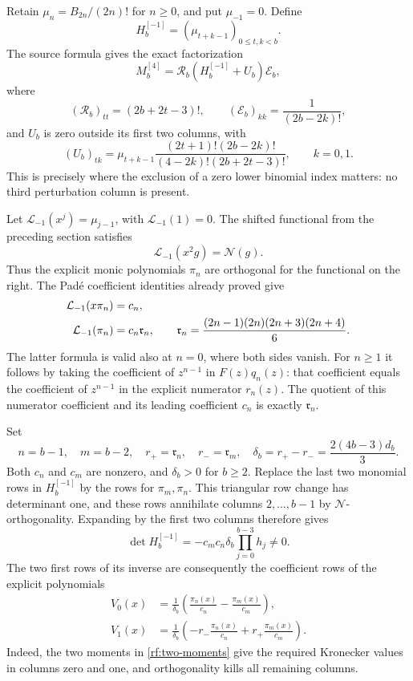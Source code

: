 Retain $\mu_n=B_{2n}/(2n)!$ for $n\geq0$, and put $\mu_{-1}=0$.
Define
\[
 H_b^{[-1]}=(\mu_{t+k-1})_{0\leq t,k<b}.
\]
The source formula gives the exact factorization
\begin{equation}\label{rf:factorization}
 M_b^{[4]}=\mathcal R_b(H_b^{[-1]}+U_b)\mathcal E_b,
\end{equation}
where
\[
 (\mathcal R_b)_{tt}=(2b+2t-3)!,\qquad
 (\mathcal E_b)_{kk}=\frac1{(2b-2k)!},
\]
and $U_b$ is zero outside its first two columns, with
\begin{equation}\label{rf:U}
 (U_b)_{tk}=\mu_{t+k-1}
  \frac{(2t+1)!(2b-2k)!}
       {(4-2k)!(2b+2t-3)!},\qquad k=0,1.
\end{equation}
This is precisely where the exclusion of a zero lower binomial
index matters: no third perturbation column is present.

Let $\mathcal L_{-1}(x^j)=\mu_{j-1}$, with
$\mathcal L_{-1}(1)=0$.  The shifted functional from the preceding
section satisfies
\[
 \mathcal L_{-1}(x^2g)=\mathcal N(g).
\]
Thus the explicit monic polynomials $\pi_n$ are orthogonal for the
functional on the right.  The Pad\'e coefficient identities already
proved give
\begin{align}
 \mathcal L_{-1}(x\pi_n)&=c_n,\notag\\
 \mathcal L_{-1}(\pi_n)&=c_n\mathfrak r_n,
 \qquad
 \mathfrak r_n=\frac{(2n-1)(2n)(2n+3)(2n+4)}6.
 \label{rf:two-moments}
\end{align}
The latter formula is valid also at $n=0$, where both sides vanish.
For $n\geq1$ it follows by taking the coefficient of $z^{n-1}$
in $F(z)q_n(z)$: that coefficient equals the coefficient of
$z^{n-1}$ in the explicit numerator $r_n(z)$.  The quotient of
this numerator coefficient and its leading coefficient $c_n$ is
exactly $\mathfrak r_n$.

Set
\[
 n=b-1,\quad m=b-2,\quad
 r_+=\mathfrak r_n,\quad r_-=\mathfrak r_m,
 \quad \delta_b=r_+-r_-
      =\frac{2(4b-3)d_b}{3}.
\]
Both $c_n$ and $c_m$ are nonzero, and $\delta_b>0$ for $b\geq2$.
Replace the last two monomial rows in $H_b^{[-1]}$ by the rows
for $\pi_m,\pi_n$.  This triangular row change has determinant
one, and these rows annihilate columns $2,\ldots,b-1$ by
$\mathcal N$-orthogonality.  Expanding by the first two columns
therefore gives
\begin{equation}\label{rf:Hdet}
 \det H_b^{[-1]}
 =-c_mc_n\delta_b\prod_{j=0}^{b-3}h_j\ne0.
\end{equation}
The two first rows of its inverse are consequently the coefficient
rows of the explicit polynomials
\begin{align}
 V_0(x)&=\frac1{\delta_b}
       \left(\frac{\pi_n(x)}{c_n}-\frac{\pi_m(x)}{c_m}\right),
       \label{rf:inverse0}\\
 V_1(x)&=\frac1{\delta_b}
       \left(-r_-\frac{\pi_n(x)}{c_n}
                       +r_+\frac{\pi_m(x)}{c_m}\right).
       \label{rf:inverse1}
\end{align}
Indeed, the two moments in \eqref{rf:two-moments} give the required
Kronecker values in columns zero and one, and orthogonality kills
all remaining columns.

